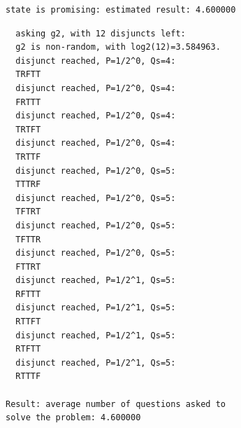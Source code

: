 \documentclass[twoside,twocolumn,a4paper,11pt]{article}
\theoremstyle{definition}
\begin{document}
\vspace{-14pt}
\begin{verbatim}
state is promising: estimated result: 4.600000
\end{verbatim}
\enlargethispage{0.7\baselineskip}
\vspace{-14pt}
\begin{verbatim}
  asking g2, with 12 disjuncts left:
  g2 is non-random, with log2(12)=3.584963.
  disjunct reached, P=1/2^0, Qs=4:
  TRFTT
  disjunct reached, P=1/2^0, Qs=4:
  FRTTT
  disjunct reached, P=1/2^0, Qs=4:
  TRTFT
  disjunct reached, P=1/2^0, Qs=4:
  TRTTF
  disjunct reached, P=1/2^0, Qs=5:
  TTTRF
  disjunct reached, P=1/2^0, Qs=5:
  TFTRT
  disjunct reached, P=1/2^0, Qs=5:
  TFTTR
  disjunct reached, P=1/2^0, Qs=5:
  FTTRT
  disjunct reached, P=1/2^1, Qs=5:
  RFTTT
  disjunct reached, P=1/2^1, Qs=5:
  RTTFT
  disjunct reached, P=1/2^1, Qs=5:
  RTFTT
  disjunct reached, P=1/2^1, Qs=5:
  RTTTF

Result: average number of questions asked to 
solve the problem: 4.600000
\end{verbatim}
\vspace{-0.5em}
\enlargethispage{0.7\baselineskip}



%
%
%


\end{document}
